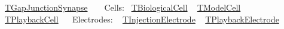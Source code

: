  \hyperlink{class_t_gap_junction_synapse}{T\+Gap\+Junction\+Synapse} ~\newline
 ~\newline
 Cells\+:~\newline
 \hyperlink{class_t_biological_cell}{T\+Biological\+Cell} ~\newline
 \hyperlink{class_t_model_cell}{T\+Model\+Cell} ~\newline
 \hyperlink{class_t_playback_cell}{T\+Playback\+Cell}~\newline
 ~\newline
 Electrodes\+: ~\newline
 \hyperlink{class_t_injection_electrode}{T\+Injection\+Electrode} ~\newline
 \hyperlink{class_t_playback_electrode}{T\+Playback\+Electrode} ~\newline
 